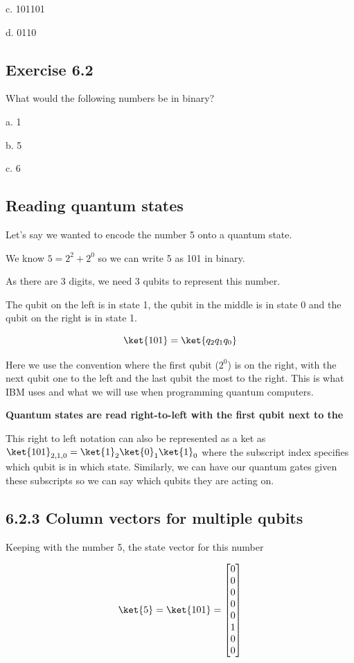 \documentclass{book}
\begin{document}
c. 101101

d. 0110

\subsection{Exercise 6.2}

What would the following numbers be in binary? 

a. 1 

b. 5

c. 6 \newline


\subsection{ Reading quantum states }

Let's say we wanted to encode the number 5 onto a quantum state. 

We know $ 5 = 2^2 + 2^0$ so we can write 5 as 101 in binary. 

As there are 3 digits, we need 3 qubits to represent this number. 

The qubit on the left is in state 1, the qubit in the middle is in state 0 and the qubit on the right is in state 1. 

$$ \ket{101} = \ket{q_2q_1q_0} $$

Here we use the convention where the first qubit ($2^0$) is on the right, with the next qubit one to the left and the last qubit the most to the right. This is what IBM uses and what we will use when programming quantum computers.

\textbf{Quantum states are read right-to-left with the first qubit next to the $\>$}

This right to left notation can also be represented as a ket as $\ket{101}_{2,1,0} = \ket{1}_2\ket{0}_1\ket{1}_0$ where the subscript index specifies which qubit is in which state. Similarly, we can have our quantum gates given these subscripts so we can say which qubits they are acting on. 

\subsection{6.2.3 Column vectors for multiple qubits}

Keeping with the number 5, the state vector for this number 

$$ \ket{5} = \ket{101} = \begin{bmatrix} 0 \\ 0\\ 0\\ 0\\ 0\\ 1\\0\\0 \end{bmatrix} $$
\end{document}
